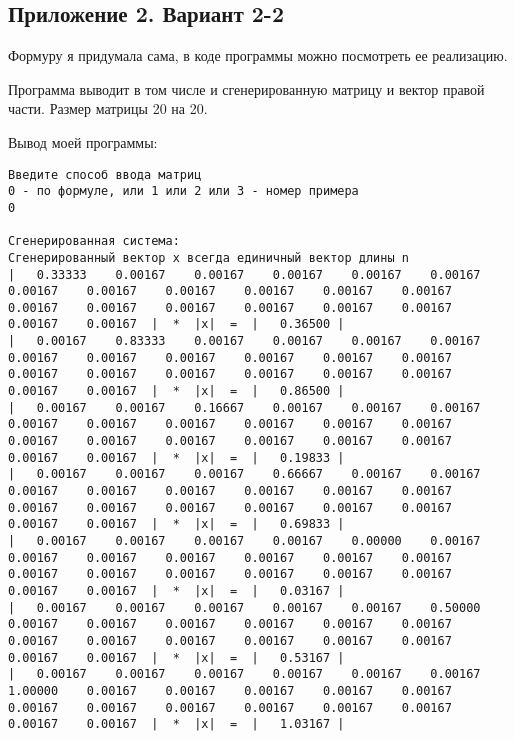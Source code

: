 \documentclass[a4paper,12pt,titlepage,finall]{article}
\begin{document}
\newpage

\subsection{Приложение 2. Вариант 2-2}

Формуру я придумала сама, в коде программы можно посмотреть ее реализацию.

Программа выводит в том числе и сгенерированную матрицу и вектор правой части.
Размер матрицы 20 на 20.


Вывод моей программы:

\begin{verbatim}
Введите способ ввода матриц
0 - по формуле, или 1 или 2 или 3 - номер примера
0

Сгенерированная система:
Сгенерированный вектор x всегда единичный вектор длины n
|   0.33333    0.00167    0.00167    0.00167    0.00167    0.00167    0.00167    0.00167    0.00167    0.00167    0.00167    0.00167    0.00167    0.00167    0.00167    0.00167    0.00167    0.00167    0.00167    0.00167  |  *  |x|  =  |   0.36500 |
|   0.00167    0.83333    0.00167    0.00167    0.00167    0.00167    0.00167    0.00167    0.00167    0.00167    0.00167    0.00167    0.00167    0.00167    0.00167    0.00167    0.00167    0.00167    0.00167    0.00167  |  *  |x|  =  |   0.86500 |
|   0.00167    0.00167    0.16667    0.00167    0.00167    0.00167    0.00167    0.00167    0.00167    0.00167    0.00167    0.00167    0.00167    0.00167    0.00167    0.00167    0.00167    0.00167    0.00167    0.00167  |  *  |x|  =  |   0.19833 |
|   0.00167    0.00167    0.00167    0.66667    0.00167    0.00167    0.00167    0.00167    0.00167    0.00167    0.00167    0.00167    0.00167    0.00167    0.00167    0.00167    0.00167    0.00167    0.00167    0.00167  |  *  |x|  =  |   0.69833 |
|   0.00167    0.00167    0.00167    0.00167    0.00000    0.00167    0.00167    0.00167    0.00167    0.00167    0.00167    0.00167    0.00167    0.00167    0.00167    0.00167    0.00167    0.00167    0.00167    0.00167  |  *  |x|  =  |   0.03167 |
|   0.00167    0.00167    0.00167    0.00167    0.00167    0.50000    0.00167    0.00167    0.00167    0.00167    0.00167    0.00167    0.00167    0.00167    0.00167    0.00167    0.00167    0.00167    0.00167    0.00167  |  *  |x|  =  |   0.53167 |
|   0.00167    0.00167    0.00167    0.00167    0.00167    0.00167    1.00000    0.00167    0.00167    0.00167    0.00167    0.00167    0.00167    0.00167    0.00167    0.00167    0.00167    0.00167    0.00167    0.00167  |  *  |x|  =  |   1.03167 |

\end{verbatim}
\end{document}
